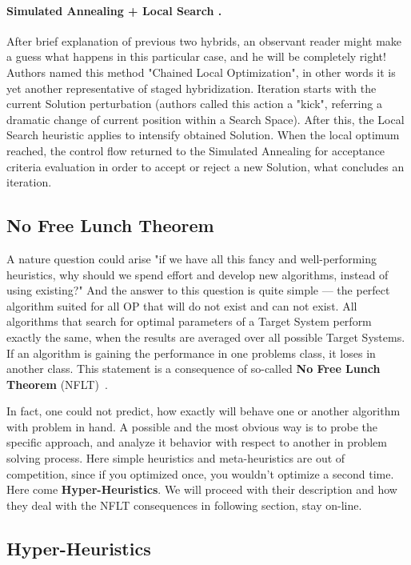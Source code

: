 \paragraph{Simulated Annealing + Local Search \cite{martin1996combining}.}
After brief explanation of previous two hybrids, an observant reader might make a guess what happens in this particular case, and he will be completely right!
Authors named this method "Chained Local Optimization", in other words it is yet another representative of staged hybridization. Iteration starts with the current Solution perturbation (authors called this action a "kick", referring a dramatic change of current position within a Search Space). After this, the Local Search heuristic applies to intensify obtained Solution. When the local optimum reached, the control flow returned to the Simulated Annealing for acceptance criteria evaluation in order to accept or reject a new Solution, what concludes an iteration.


\subsection{No Free Lunch Theorem}
A nature question could arise "if we have all this fancy and well-performing heuristics, why should we spend effort and develop new algorithms, instead of using existing?" And the answer to this question is quite simple — the perfect algorithm suited for all OP that will do not exist and can not exist. All algorithms that search for optimal parameters of a Target System perform exactly the same, when the results are averaged over all possible Target Systems. If an algorithm is gaining the performance in one problems class, it loses in another class. This statement is a consequence of so-called \textbf{No Free Lunch Theorem} (NFLT)~\cite{wolpert1997no}.

In fact, one could not predict, how exactly will behave one or another algorithm with problem in hand. A possible and the most obvious way is to probe the specific approach, and analyze it behavior with respect to another in problem solving process. Here simple heuristics and meta-heuristics are out of competition, since if you optimized once, you wouldn't optimize a second time.
Here come \textbf{Hyper-Heuristics}. We will proceed with their description and how they deal with the NFLT consequences in following section, stay on-line.


\subsection{Hyper-Heuristics}

